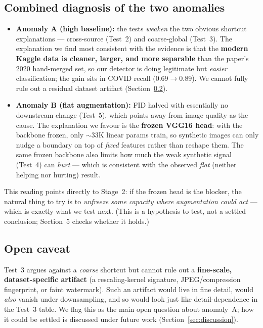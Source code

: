 \documentclass[11pt]{article}
\begin{document}
\subsection{Combined diagnosis of the two anomalies}
\label{sec:diagnosis}
\begin{itemize}[nosep,leftmargin=1.4em]
  \item \textbf{Anomaly A (high baseline):} the tests \emph{weaken} the two obvious
        shortcut explanations --- cross-source (Test~2) and coarse-global (Test~3).
        The explanation we find most consistent with the evidence is that the
        \textbf{modern Kaggle data is cleaner, larger, and more separable} than the
        paper's 2020 hand-merged set, so our detector is doing legitimate but
        \emph{easier} classification; the gain sits in COVID recall
        (0.69$\to$0.89). We cannot fully rule out a residual dataset artifact
        (Section~\ref{sec:caveat}).
  \item \textbf{Anomaly B (flat augmentation):} FID halved with essentially no
        downstream change (Test~5), which points away from image quality as the
        cause. The explanation we favour is the \textbf{frozen VGG16 head}: with the
        backbone frozen, only $\sim$33K linear params train, so synthetic images can
        only nudge a boundary on top of \emph{fixed} features rather than reshape
        them. The same frozen backbone also limits how much the weak synthetic
        signal (Test~4) can \emph{hurt} --- which is consistent with the observed
        \emph{flat} (neither helping nor hurting) result.
\end{itemize}
\noindent This reading points directly to Stage~2: if the frozen head is the
blocker, the natural thing to try is to \emph{unfreeze some capacity where
augmentation could act} --- which is exactly what we test next. (This is a
hypothesis to test, not a settled conclusion; Section~5 checks whether it holds.)

\subsection{Open caveat}
\label{sec:caveat}
Test~3 argues against a \emph{coarse} shortcut but cannot rule out a
\textbf{fine-scale, dataset-specific artifact} (a rescaling-kernel signature,
JPEG/compression fingerprint, or faint watermark). Such an artifact would live in
fine detail, would \emph{also} vanish under downsampling, and so would look just
like detail-dependence in the Test~3 table. We flag this as the main open question
about anomaly~A; how it could be settled is discussed under future work
(Section~\ref{sec:discussion}).
\end{document}

